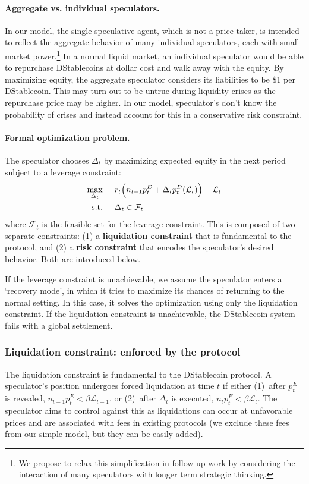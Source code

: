 \paragraph{Aggregate vs. individual speculators.}
In our model, the single speculative agent, which is not a price-taker, is intended to reflect the aggregate behavior of many individual speculators, each with small market power.\footnote{We propose to relax this simplification in follow-up work by considering the interaction of many speculators with longer term strategic thinking.} In a normal liquid market, an individual speculator would be able to repurchase DStablecoins at dollar cost and walk away with the equity. By maximizing equity, the aggregate speculator considers its liabilities to be \$1 per DStablecoin. This may turn out to be untrue during liquidity crises as the repurchase price may be higher. In our model, speculator's don't know the probability of crises and instead account for this in a conservative risk constraint.




\paragraph{Formal optimization problem.}
The speculator chooses $\Delta_t$ by maximizing expected equity in the next period subject to a leverage constraint:
$$\begin{aligned}
\max_{\Delta_t} \hspace{0.5cm} & r_t\Big(n_{t-1}p^E_t + \Delta_t p^D_t(\mathcal{L}_t)\Big) - \mathcal{L}_t \\
\text{s.t.} \hspace{0.5cm} & \Delta_t \in \mathcal{F}_t
\end{aligned}$$
where $\mathcal{F}_t$ is the feasible set for the leverage constraint. This is composed of two separate constraints: (1) a \textbf{liquidation constraint} that is fundamental to the protocol, and (2) a \textbf{risk constraint} that encodes the speculator's desired behavior. Both are introduced below.

If the leverage constraint is unachievable, we assume the speculator enters a `recovery mode', in which it tries to maximize its chances of returning to the normal setting. In this case, it solves the optimization using only the liquidation constraint. If the liquidation constraint is unachievable, the DStablecoin system fails with a global settlement.




\subsubsection{Liquidation constraint: enforced by the protocol}
The liquidation constraint is fundamental to the DStablecoin protocol. A speculator's position undergoes forced liquidation at time $t$ if either (1)~after $p_t^E$ is revealed, $n_{t-1} p^E_t < \beta \mathcal{L}_{t-1}$, or (2)~after $\Delta_t$ is executed, $n_t p_t^E < \beta \mathcal{L}_t$. The speculator aims to control against this as liquidations can occur at unfavorable prices and are associated with fees in existing protocols (we exclude these fees from our simple model, but they can be easily added).

